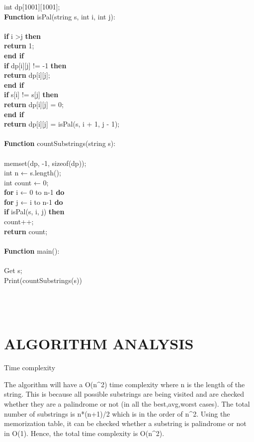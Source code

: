 \documentclass[twocolumn]{article}
\begin{document}
int dp[1001][1001];\\
\textbf{Function} isPal(string s, int i, int j):\\
\\
          \textbf{\qquad if} \:i \textgreater \:j 	\textbf{then} \\
         \textbf{return }  1;\\
\textbf{end if }	\\
	\textbf{if } dp[i][j] != -1 \textbf{then} \\
	  \textbf{return } dp[i][j];\\
	\textbf{end if }\\
	\textbf{if } s[i] != s[j]  \textbf{then}\\
	    \textbf{return }  dp[i][j] = 0;\\
\textbf{end if }\\
	  \textbf{return }  dp[i][j] = isPal(s, i + 1, j - 1);\\
\noindent 
\\
\textbf{Function} countSubstrings(string s):\\
\\
\noindent 
	memset(dp, -1, sizeof(dp));\\
	int n ← s.length();\\
	int count ← 0;\\
	\textbf{for}  i ←  0 to n-1 \textbf{do}\\
	    	\textbf{for}  j ←  i  to n-1  \textbf{do}\\
		\textbf{if } isPal(s, i, j) \textbf{then} 	 \\
count++;\\
	  \textbf{return }  count;\\
\\
\textbf{Function} main():    \\
\\
    Get s;\\
    Print(countSubstrings(s))\\
\\
\\
\\
\section{ ALGORITHM ANALYSIS
}
Time complexity

The algorithm will have a O(n^2) time complexity where n is the length of the string. This is because all possible substrings are being visited and are checked whether they are a palindrome or not (in all the best,avg,worst cases). The total number of substrings is n*(n+1)/2 which is in the order of n^2. Using the memorization table, it can be checked whether a substring is palindrome or not in O(1). Hence, the total time complexity is O(n^2). 
\end{document}
